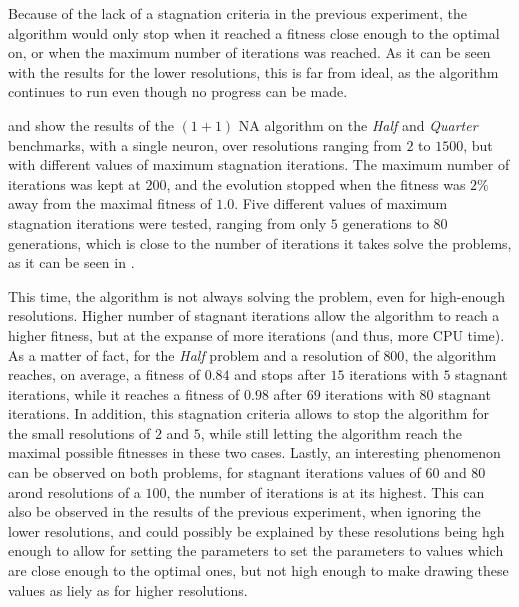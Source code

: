 Because of the lack of a stagnation criteria in the previous experiment, the algorithm would only stop when it reached a fitness close enough to the optimal on, or when
the maximum number of iterations was reached. As it can be seen with the results for the lower resolutions, this is far from ideal, as the algorithm continues to run even
though no progress can be made.

 and  show the results of the $(1 + 1)$ NA algorithm on the \textit{Half} and \textit{Quarter} benchmarks, with a single neuron, over
resolutions ranging from $2$ to $1500$, but with different values of maximum stagnation iterations. The maximum number of iterations was kept at $200$, and the evolution stopped when the fitness
was $2\%$ away from the maximal fitness of $1.0$. Five different values of maximum stagnation iterations were tested, ranging from only $5$ generations to $80$ generations, which is close to
the number of iterations it takes solve the problems, as it can be seen in .

This time, the algorithm is not always solving the problem, even for high-enough resolutions. Higher number of stagnant iterations allow the algorithm to reach a higher fitness, but at the
expanse of more iterations (and thus, more CPU time). As a matter of fact, for the \textit{Half} problem and a resolution of $800$, the algorithm reaches, on average, a fitness of
$0.84$ and stops after $15$ iterations with $5$ stagnant iterations, while it reaches a fitness of $0.98$ after $69$ iterations with $80$ stagnant iterations.
In addition, this stagnation criteria allows to stop the algorithm for the small resolutions of $2$ and $5$, while still letting the algorithm reach the maximal possible fitnesses in these
two cases. Lastly, an interesting phenomenon can be observed on both problems, for stagnant iterations values of $60$ and $80$ arond resolutions of a $100$, the number of iterations
is at its highest. This can also be observed in the results of the previous experiment, when ignoring the lower resolutions, and could possibly be explained by these resolutions being hgh enough
to allow for setting the parameters to set the parameters to values which are close enough to the optimal ones, but not high enough to make drawing these values as liely as for higher resolutions.

